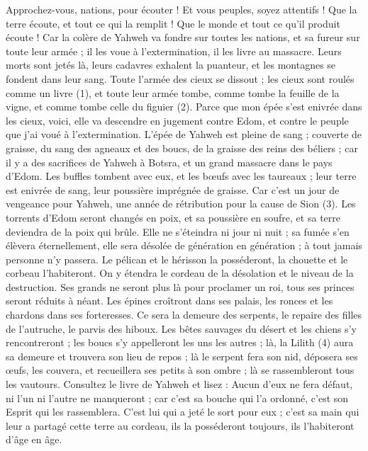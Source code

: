 \begin{multicols}{2}
\VerseOne{}Approchez-vous, nations, pour écouter ! Et vous peuples, soyez attentifs ! Que la terre écoute, et tout ce qui la remplit ! Que le monde et tout ce qu’il produit écoute !
Car la colère de Yahweh va fondre sur toutes les nations, et sa fureur sur toute leur armée ; il les voue à l’extermination, il les livre au massacre.
Leurs morts sont jetés là, leurs cadavres exhalent la puanteur, et les montagnes se fondent dans leur sang.
Toute l'armée des cieux se dissout ; les cieux sont roulés comme un livre (1), et toute leur armée tombe, comme tombe la feuille de la vigne, et comme tombe celle du figuier (2).
Parce que mon épée s’est enivrée dans les cieux, voici, elle va descendre en jugement contre Edom, et contre le peuple que j'ai voué à l’extermination.
L'épée de Yahweh est pleine de sang ; couverte de graisse, du sang des agneaux et des boucs, de la graisse des reins des béliers ; car il y a des sacrifices de Yahweh à Botsra, et un grand massacre dans le pays d'Edom.
Les buffles tombent avec eux, et les bœufs avec les taureaux ; leur terre est enivrée de sang, leur poussière imprégnée de graisse.
Car c’est un jour de vengeance pour Yahweh, une année de rétribution pour la cause de Sion (3).
Les torrents d’Edom seront changés en poix, et sa poussière en soufre, et sa terre deviendra de la poix qui brûle.
Elle ne s’éteindra ni jour ni nuit ; sa fumée s’en élèvera éternellement, elle sera désolée de génération en génération ; à tout jamais personne n’y passera.
Le pélican et le hérisson la posséderont, la chouette et le corbeau l’habiteront. On y étendra le cordeau de la désolation et le niveau de la destruction.
Ses grands ne seront plus là pour proclamer un roi, tous ses princes seront réduits à néant.
Les épines croîtront dans ses palais, les ronces et les chardons dans ses forteresses. Ce sera la demeure des serpents, le repaire des filles de l’autruche, le parvis des hiboux.
Les bêtes sauvages du désert et les chiens s’y rencontreront ; les boucs s’y appelleront les uns les autres ; là, la Lilith (4) aura sa demeure et trouvera son lieu de repos ;
là le serpent fera son nid, déposera ses œufs, les couvera, et recueillera ses petits à son ombre ; là se rassembleront tous les vautours.
Consultez le livre de Yahweh et lisez : Aucun d’eux ne fera défaut, ni l’un ni l’autre ne manqueront ; car c'est sa bouche qui l'a ordonné, c’est son Esprit qui les rassemblera.
C’est lui qui a jeté le sort pour eux ; c’est sa main qui leur a partagé cette terre au cordeau, ils la posséderont toujours, ils l’habiteront d'âge en âge.

\end{multicols}
